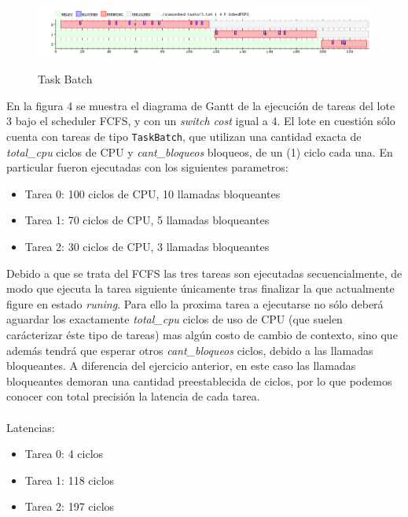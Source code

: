 \begin{figure}[h]
    \includegraphics[width=\linewidth]{images/3.png}
    \label{fig:Task Consola}
    \caption{Task Batch}
\end{figure}

En la figura 4 se muestra el diagrama de Gantt de la ejecución de tareas del lote 3 bajo el scheduler FCFS, y con un \textit{switch cost} igual a 4. El lote en cuestión sólo cuenta con tareas de tipo \texttt{TaskBatch}, que utilizan una cantidad exacta de \textit{total\_cpu} ciclos de CPU y \textit{cant\_bloqueos} bloqueos, de un (1) ciclo cada una. En particular fueron ejecutadas con los siguientes parametros:

\begin{itemize}
	\item Tarea 0: 100 ciclos de CPU, 10 llamadas bloqueantes
	\item Tarea 1: 70 ciclos de CPU, 5 llamadas bloqueantes
	\item Tarea 2: 30 ciclos de CPU, 3 llamadas bloqueantes
\end{itemize}

Debido a que se trata del FCFS las tres tareas son ejecutadas secuencialmente, de modo que ejecuta la tarea siguiente únicamente tras finalizar la que actualmente figure en estado \textit{runing}. Para ello la proxima tarea a ejecutarse no sólo deberá aguardar los exactamente \textit{total\_cpu} ciclos de uso de CPU (que suelen carácterizar éste tipo de tareas) mas algún costo de cambio de contexto, sino que además tendrá que esperar otros \textit{cant\_bloqueos} ciclos, debido a las llamadas bloqueantes. A diferencia del ejercicio anterior, en este caso las llamadas bloqueantes demoran una cantidad preestablecida de ciclos, por lo que podemos conocer con total precisión la latencia de cada tarea.
\\
\\
\textsf{Latencias:}
\begin{itemize}
	\item Tarea 0: 4 ciclos
	\item Tarea 1: 118 ciclos
	\item Tarea 2: 197 ciclos 
\end{itemize}

